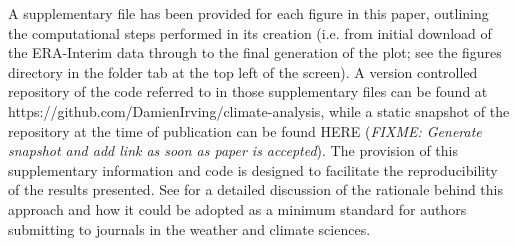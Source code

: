 A supplementary file has been provided for each figure in this paper, outlining the computational steps performed in its creation (i.e. from initial download of the ERA-Interim data through to the final generation of the plot; see the figures directory in the folder tab at the top left of the screen). A version controlled repository of the code referred to in those supplementary files can be found at https://github.com/DamienIrving/climate-analysis, while a static snapshot of the repository at the time of publication can be found HERE (\textit{FIXME: Generate snapshot and add link as soon as paper is accepted}). The provision of this supplementary information and code is designed to facilitate the reproducibility of the results presented. See \citet{Irving2015} for a detailed discussion of the rationale behind this approach and how it could be adopted as a minimum standard for authors submitting to journals in the weather and climate sciences. 